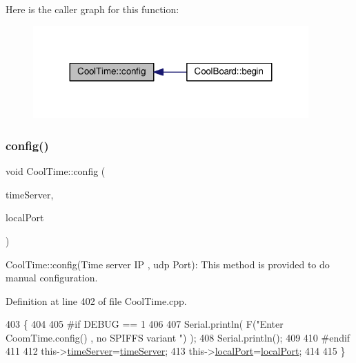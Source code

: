 Here is the caller graph for this function\+:\nopagebreak
\begin{figure}[H]
\begin{center}
\leavevmode
\includegraphics[width=299pt]{d6/d49/class_cool_time_a87c28260c1bc77091162cbcf1ee2e129_icgraph}
\end{center}
\end{figure}
\mbox{\label{class_cool_time_a014656d0d3f74d6391364b92b13e0780}} 
\subsubsection{\texorpdfstring{config()}{config()}\hspace{0.1cm}{\footnotesize\ttfamily [2/2]}}
{\footnotesize\ttfamily void Cool\+Time\+::config (\begin{DoxyParamCaption}\item[{I\+P\+Address}]{time\+Server,  }\item[{unsigned int}]{local\+Port }\end{DoxyParamCaption})}

Cool\+Time\+::config(\+Time server I\+P , udp Port)\+: This method is provided to do manual configuration. 

Definition at line 402 of file Cool\+Time.\+cpp.


\begin{DoxyCode}
403 \{
404 
405 \textcolor{preprocessor}{#if DEBUG == 1 }
406 
407     Serial.println( F(\textcolor{stringliteral}{"Enter CoomTime.config() , no SPIFFS variant "}) );
408     Serial.println();
409 
410 \textcolor{preprocessor}{#endif }
411 
412     this->\hyperlink{class_cool_time_ad2b9858f399108cb440dd1e908916f04}{timeServer}=\hyperlink{class_cool_time_ad2b9858f399108cb440dd1e908916f04}{timeServer};
413     this->\hyperlink{class_cool_time_a2f777da44d7ba678be8185299e9b49d1}{localPort}=\hyperlink{class_cool_time_a2f777da44d7ba678be8185299e9b49d1}{localPort};
414     
415 \} 
\end{DoxyCode}
\mbox{\label{class_cool_time_acd537cd4210d7bde4e1f5c47d2ac0456}} 
